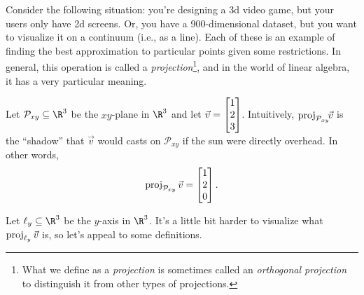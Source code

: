 Consider the following situation: you're designing a 3d video game, but your users only have 2d screens.
Or, you have a 900-dimensional dataset, but you want to visualize it on a continuum (i.e., as a line). 
Each of these is an example
of finding the best approximation to particular points given some restrictions. In general, this operation
is called a \emph{projection}\footnote{ What we define as a \emph{projection} is sometimes
called an \emph{orthogonal projection} to distinguish it from other types of projections.}, 
and in the world of linear algebra, it has a very particular meaning.


Let $\mathcal P_{xy}\subseteq\R^3$ be the $xy$-plane in $\R^3$ and let $\vec v=\mat{1\\2\\3}$. Intuitively, 
$\operatorname{proj}_{\mathcal P_{xy}}\!\!\vec v$ is the ``shadow'' that  $\vec v$ would casts on ${\mathcal P_{xy}}$ if 
the sun were directly overhead.
In other words,
\[
	\Proj_{\mathcal P_{xy}}\vec v=\mat{1\\2\\0}.
\]

\begin{center}
\end{center}

Let $\ell_y\subseteq \R^3$ be the $y$-axis in $\R^3$. It's a little bit harder to visualize what $\operatorname{proj}_{\ell_y}\vec v$
is, so let's appeal to some definitions.

